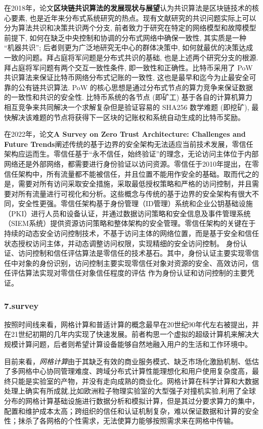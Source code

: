 \documentclass[a4paper,twoside]{scrbook}
\begin{document}
在2018年，论文\textbf{区块链共识算法的发展现状与展望}认为共识算法是区块链技术的核心要素, 也是近年来分布式系统研究的热点。现有文献研究的共识问题实际上可以分为算法共识和决策共识两个分支, 前者致力于研究在特定的网络模型和故障模型前提下, 如何在缺乏中央控制和协调的分布式网络中确保一致性, 其实质是一种 “机器共识”; 后者则更为广泛地研究无中心的群体决策中, 如何就最优的决策达成一致的问题。拜占庭将军问题是分布式共识的基础, 也是上述两个研究分支的根源. 拜占庭将军问题有两个交互一致性条件, 即一致性和正确性。比特币采用了 PoW 共识算法来保证比特币网络分布式记账的一致性, 这也是最早和迄今为止最安全可靠的公有链共识算法. PoW 的核心思想是通过分布式节点的算力竞争来保证数据的一致性和共识的安全性. 比特币系统的各节点 (即矿工) 基于各自的计算机算力相互竞争来共同解决一个求解复杂但是验证容易的 SHA256 数学难题 (即挖矿), 最快解决该难题的节点将获得下一区块的记账权和系统自动生成的比特币奖励。

在2022年，论文\textbf{A Survey on Zero Trust Architecture: Challenges and Future Trends}阐述传统的基于边界的安全架构无法适应当前技术发展，零信任架构应运而生。零信任基于“永不信任，始终验证”的理念，无论访问主体位于内部网络还是外部网络，都需要进行身份验证以访问资源。零信任于2010年提出，在零信任架构中，所有流量都不能被信任，并且位置不能用作安全的基础。取而代之的是，需要对所有访问采取安全措施，采取最低授权策略和严格的访问控制，并且需要对所有流量进行可视化和分析。这些概念与传统的基于边界的安全架构有很大不同，安全性更强。零信任架构基于身份管理（ID管理）系统和企业公钥基础设施（PKI）进行人员和设备认证，并通过数据访问策略和安全信息及事件管理系统（SIEM系统）提供资源访问策略和整体架构的安全管理。零信任架构的关键在于持续的动态安全访问控制技术，不基于访问主体的网络位置，而是基于安全和信任状态授权访问主体，并动态调整访问权限，实现精细的安全访问控制。
身份认证、访问控制和信任评估算法是零信任的技术基石。其中，身份认证主要实现零信任中对象的身份识别，访问控制主要实现零信任对象对资源的安全、高效访问，信任评估算法实现对零信任对象信任程度的评估 作为身份认证和访问控制的主要凭证。
\subsubsection{7.survey}
按照时间线来看，网格计算和普适计算的概念最早在20世纪90年代左右被提出，并在21世纪初期的几年内实现了快速发展。前者构思一个虚拟的超级计算机来解决大规模计算问题，后者则希望计算设备能够自然地融入用户的生活和工作环境中。

目前来看，\emph{网格计算}由于其缺乏有效的商业服务模式、缺乏市场化激励机制、低估了多网格中心协同管理难度、跨域分布式计算性能理想化和用户使用复杂度高，最终只能是实验室的产物，并没有走向成熟的商业化。网格计算在科学计算和大数据处理上确实有所成就,比如欧洲粒子物理实验室的大型强子对撞机实验,利用了全球分布的网格计算基础设施进行数据分析和模拟计算，但是其过分要求算力的集中，配置和维护成本太高；跨组织的信任和认证机制复杂，难以保证数据和计算的安全性；抹杀了各网格的个性需求，无法使算力能够按照需求来在网格中传输。
\end{document}
